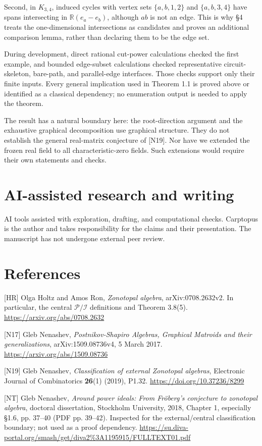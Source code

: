 \documentclass[11pt]{article}
\begin{document}
Second, in $K_{3,4}$, induced cycles with vertex sets $\{a,b,1,2\}$ and $\{a,b,3,4\}$ have spans intersecting in $\mathbb R(e_a-e_b)$, although $ab$ is not an edge. This is why \S{}4 treats the one-dimensional intersections as candidates and proves an additional comparison lemma, rather than declaring them to be the edge set.

During development, direct rational cut-power calculations checked the first example, and bounded edge-subset calculations checked representative circuit-skeleton, bare-path, and parallel-edge interfaces. Those checks support only their finite inputs. Every general implication used in Theorem 1.1 is proved above or identified as a classical dependency; no enumeration output is needed to apply the theorem.

The result has a natural boundary here: the root-direction argument and the exhaustive graphical decomposition use graphical structure. They do not establish the general real-matrix conjecture of [N19]. Nor have we extended the frozen real field to all characteristic-zero fields. Such extensions would require their own statements and checks.

\section*{AI-assisted research and writing}

AI tools assisted with exploration, drafting, and computational checks. Carptopus is the author and takes responsibility for the claims and their presentation. The manuscript has not undergone external peer review.

\section*{References}

[HR] Olga Holtz and Amos Ron, \emph{Zonotopal algebra}, arXiv:0708.2632v2. In particular, the central $\mathcal P/\mathcal I$ definitions and Theorem 3.8(5). \url{https://arxiv.org/abs/0708.2632}

[N17] Gleb Nenashev, \emph{Postnikov-Shapiro Algebras, Graphical Matroids and their generalizations}, arXiv:1509.08736v4, 5 March 2017. \url{https://arxiv.org/abs/1509.08736}

[N19] Gleb Nenashev, \emph{Classification of external Zonotopal algebras}, Electronic Journal of Combinatorics \textbf{26}(1) (2019), P1.32. \url{https://doi.org/10.37236/8299}

[NT] Gleb Nenashev, \emph{Around power ideals: From Fr\"{o}berg's conjecture to zonotopal algebra}, doctoral dissertation, Stockholm University, 2018, Chapter 1, especially \S{}1.6, pp. 37--40 (PDF pp. 39--42). Inspected for the external/central classification boundary; not used as a proof dependency. \url{https://su.diva-portal.org/smash/get/diva2%3A1195915/FULLTEXT01.pdf}
\end{document}
